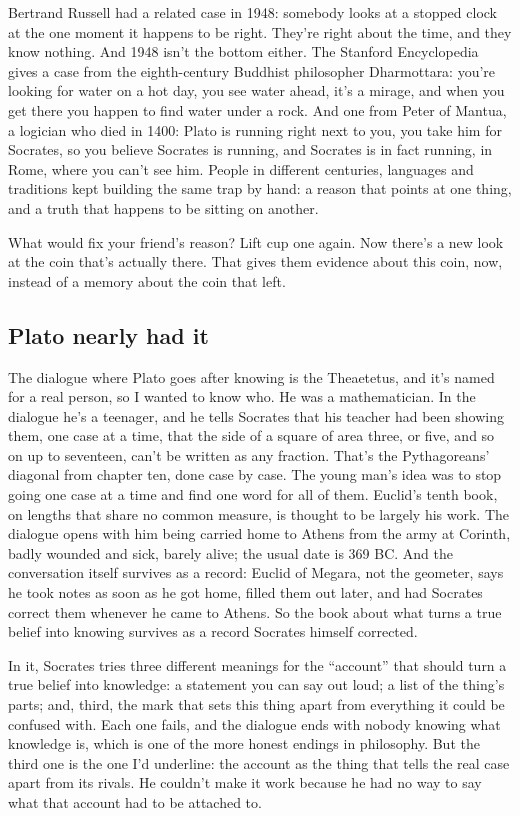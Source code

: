 \documentclass[11pt,twoside]{article}
\theoremstyle{thielethm}
\theoremstyle{thieledef}
\theoremstyle{thieledef}
\theoremstyle{thieledef}
\theoremstyle{thielethm}
\theoremstyle{thieleobs}
\theoremstyle{thielethm}
\begin{document}
Bertrand Russell had a related case in 1948: somebody looks at a stopped clock at the one moment it happens to be right. They're right about the time, and they know nothing. And 1948 isn't the bottom either. The Stanford Encyclopedia gives a case from the eighth-century Buddhist philosopher Dharmottara: you're looking for water on a hot day, you see water ahead, it's a mirage, and when you get there you happen to find water under a rock. And one from Peter of Mantua, a logician who died in 1400: Plato is running right next to you, you take him for Socrates, so you believe Socrates is running, and Socrates is in fact running, in Rome, where you can't see him. People in different centuries, languages and traditions kept building the same trap by hand: a reason that points at one thing, and a truth that happens to be sitting on another.

What would fix your friend's reason? Lift cup one again. Now there's a new look at the coin that's actually there. That gives them evidence about this coin, now, instead of a memory about the coin that left.

\subsection{Plato nearly had it}

The dialogue where Plato goes after knowing is the Theaetetus, and it's named for a real person, so I wanted to know who. He was a mathematician. In the dialogue he's a teenager, and he tells Socrates that his teacher had been showing them, one case at a time, that the side of a square of area three, or five, and so on up to seventeen, can't be written as any fraction. That's the Pythagoreans' diagonal from chapter ten, done case by case. The young man's idea was to stop going one case at a time and find one word for all of them. Euclid's tenth book, on lengths that share no common measure, is thought to be largely his work. The dialogue opens with him being carried home to Athens from the army at Corinth, badly wounded and sick, barely alive; the usual date is 369 BC. And the conversation itself survives as a record: Euclid of Megara, not the geometer, says he took notes as soon as he got home, filled them out later, and had Socrates correct them whenever he came to Athens. So the book about what turns a true belief into knowing survives as a record Socrates himself corrected.

In it, Socrates tries three different meanings for the ``account'' that should turn a true belief into knowledge: a statement you can say out loud; a list of the thing's parts; and, third, the mark that sets this thing apart from everything it could be confused with. Each one fails, and the dialogue ends with nobody knowing what knowledge is, which is one of the more honest endings in philosophy. But the third one is the one I'd underline: the account as the thing that tells the real case apart from its rivals. He couldn't make it work because he had no way to say what that account had to be attached to.
\end{document}
